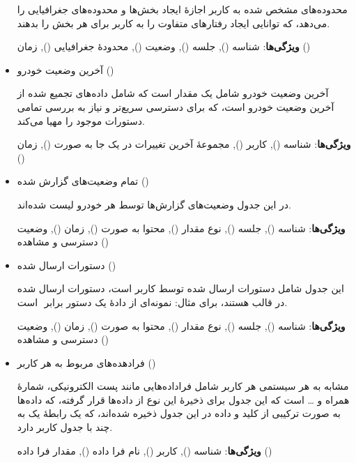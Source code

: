 \begin{itemize}[nosep]
	محدوده‌های مشخص شده به کاربر اجازهٔ ایجاد بخش‌ها و محدوده‌های جغرافیایی   را می‌دهد، که توانایی ایجاد رفتارهای متفاوت را به کاربر برای هر بخش را   بدهند.

	\textbf{ویژگی‌ها}: شناسه (), جلسه (), وضعیت (), محدودهٔ
	جغرافیایی (), زمان ()
	\item
	آخرین وضعیت خودرو ()

	آخرین وضعیت خودرو شامل یک مقدار  است که شامل داده‌های تجمیع شده از آخرین وضعیت خودرو است، که برای دسترسی سریع‌تر و نیاز به بررسی تمامی  دستورات موجود را مهیا می‌کند.

	\textbf{ویژگی‌ها}: شناسه (), کاربر (), مجموعهٔ آخرین تغییرات در یک
	جا به صورت  (), زمان ()
	\item
	تمام وضعیت‌های گزارش شده ()

	در این جدول وضعیت‌های گزارش‌ها توسط هر خودرو لیست شده‌اند.

	\textbf{ویژگی‌ها}: شناسه (), جلسه (), نوع مقدار (), محتوا به
	صورت  (), زمان (), وضعیت دسترسی و مشاهده ()
	\item
	دستورات ارسال شده ()

	این جدول شامل دستورات ارسال شده توسط کاربر است، دستورات ارسال شده در   قالب  هستند، برای مثال: نمونه‌ای از دادهٔ یک دستور برابر
	‍‍ است.

	\textbf{ویژگی‌ها}: شناسه (), جلسه (), نوع مقدار (), محتوا به
	صورت  (), زمان (), وضعیت دسترسی و مشاهده ()
	\item
	فرادهده‌های مربوط به هر کاربر ()

	مشابه به هر سیستمی هر کاربر شامل فرا‌داده‌هایی مانند پست الکترونیکی، شمارهٔ همراه و
	\ldots{}
	 است که این جدول برای ذخیرهٔ این نوع از داده‌ها   قرار گرفته، که داده‌ها به صورت ترکیبی از کلید و داده در این جدول ذخیره   شده‌اند، که یک رابطهٔ یک به چند با جدول کاربر دارد.

	\textbf{ویژگی‌ها}:
	شناسه (), کاربر (), نام فرا داده (), مقدار   فرا داده ()
\end{itemize}


